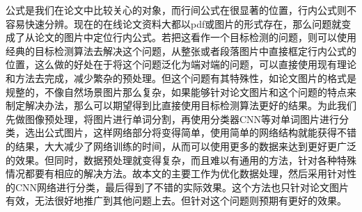 
\begin{cabstract}
	公式是我们在论文中比较关心的对象，而行间公式在很显著的位置，行内公式则不容易快速分辨。现在的在线论文资料大都以pdf或图片的形式存在，那么问题就变成了从论文的图片中定位行内公式。若把这看作一个目标检测的问题，则可以使用经典的目标检测算法去解决这个问题，从整张或者段落图片中直接框定行内公式的位置，这么做的好处在于将这个问题泛化为端对端的问题，可以直接使用现有理论和方法去完成，减少繁杂的预处理。但这个问题有其特殊性，如论文图片的格式是规整的，不像自然场景图片那么复杂，如果能够针对论文图片和这个问题的特点来制定解决办法，那么可以期望得到比直接使用目标检测算法更好的结果。为此我们先做图像预处理，将图片进行单词分割，再使用分类器CNN等对单词图片进行分类，选出公式图片，这样网络部分将变得简单，使用简单的网络结构就能获得不错的结果，大大减少了网络训练的时间，从而可以使用更多的数据来达到更好更广泛的效果。但同时，数据预处理就变得复杂，而且难以有通用的方法，针对各种特殊情况都要有相应的解决方法。故本文的主要工作为优化数据处理，然后采用针对性的CNN网络进行分类，最后得到了不错的实际效果。这个方法也只针对论文图片有效，无法很好地推广到其他问题上去。但针对这个问题则预期有更好的效果。
\end{cabstract}

